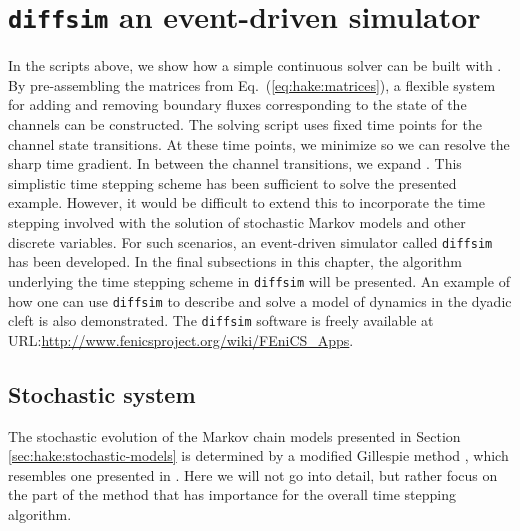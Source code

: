 \section{\texttt{diffsim} an event-driven simulator}
\label{sec:hake:diffsim}
   In
the \pydolfin scripts above, we show how a simple continuous solver
can be built with \pydolfin. By pre-assembling the matrices from
Eq.~(\ref{eq:hake:matrices}), a flexible system for adding and
removing boundary fluxes corresponding to the state of the channels
can be constructed. The solving script uses fixed time points for the
channel state transitions. At these time points, we minimize \Dt so we
can resolve the sharp time gradient. In between the channel
transitions, we expand \Dt. This simplistic time stepping scheme has
been sufficient to solve the presented example. However, it would be
difficult to extend this to incorporate the time stepping involved
with the solution of stochastic Markov models and other discrete
variables. For such scenarios, an event-driven simulator called
\texttt{diffsim} has been developed. In the final subsections in this
chapter, the algorithm underlying the time stepping scheme in
\texttt{diffsim} will be presented. An example of how one can use
\texttt{diffsim} to describe and solve a model of \Ca dynamics in the
dyadic cleft is also demonstrated. The \texttt{diffsim} software is
freely available at
URL:\url{http://www.fenicsproject.org/wiki/FEniCS_Apps}.\par

\subsection*{Stochastic system}
\label{sec:hake:stochastic-system}
    The stochastic evolution of the
Markov chain models presented in Section
\ref{sec:hake:stochastic-models} is determined by a modified Gillespie
method \cite{Gillespie1977}, which resembles one presented in
\citet{RudigerShuaiHuisingaEtAl2007}. Here we will not go into detail,
but rather focus on the part of the method that has importance for the
overall time stepping algorithm.\par

